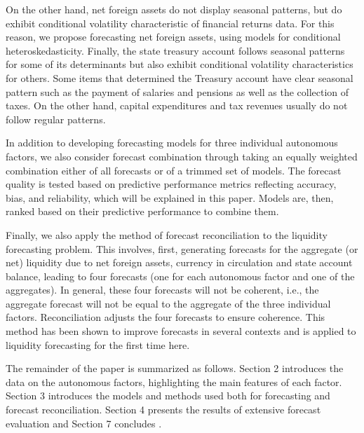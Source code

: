 On the other hand, net foreign assets do not display seasonal patterns, but do
exhibit conditional  volatility characteristic of financial  returns data. For
this  reason, we  propose forecasting  net  foreign assets,  using models  for
conditional heteroskedasticity.   Finally, the state treasury  account follows
seasonal patterns  for some of  its determinants but also  exhibit conditional
volatility characteristics for others. Some items that determined the Treasury
account  have clear  seasonal  pattern such  as the  payment  of salaries  and
pensions  as well  as the  collection  of taxes.  On the  other hand,  capital
expenditures and tax revenues usually do not follow regular patterns.

In addition to  developing forecasting models for  three individual autonomous
factors,  we also  consider  forecast combination  through  taking an  equally
weighted  combination  either  of  all  forecasts  or  of  a  trimmed  set  of
models. The forecast quality is tested based on predictive performance metrics
reflecting accuracy,  bias, and reliability,  which will be explained  in this
paper.  Models are,  then, ranked  based  on their  predictive performance  to
combine them.

Finally, we also apply the method  of forecast reconciliation to the liquidity
forecasting  problem.  This  involves,  first, generating  forecasts  for  the
aggregate  (or  net)  liquidity  due   to  net  foreign  assets,  currency  in
circulation and state account balance, leading to four forecasts (one for each
autonomous factor and one of the aggregates). In general, these four forecasts
will not be  coherent, i.e., the aggregate  forecast will not be  equal to the
aggregate of  the three  individual factors.  Reconciliation adjusts  the four
forecasts to ensure coherence. This method has been shown to improve forecasts
in several contexts and is applied to liquidity forecasting for the first time
here.


The remainder of the paper is  summarized as follows. Section 2 introduces the
data  on  the autonomous  factors,  highlighting  the  main features  of  each
factor. Section 3 introduces the models  and methods used both for forecasting
and  forecast reconciliation.  Section  4 presents  the  results of  extensive
forecast evaluation and Section 7 concludes .

